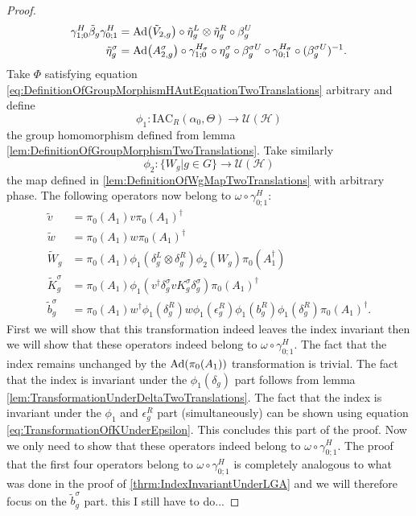 \documentclass[12pt,a4paper,twoside]{article}
\newcommand{\IAC}{\textrm{IAC}}
\let\originalleft\left
\let\originalright\right
\renewcommand{\left}{\mathopen{}\mathclose\bgroup\originalleft}
\renewcommand{\right}{\aftergroup\egroup\originalright}
\newcommand{\UU}{\mathcal U}
\newcommand{\HH}{\mathcal H}
\newcommand{\Ad}[1]{\textrm{Ad}\left(#1\right)}
\theoremstyle{definition}
\numberwithin{equation}{section}
\begin{document}
\begin{proof}
	\begin{align}
		\label{eq:IndexInvariantUnderLGAEtaTildeDefiniton1TwoTrans}
		\gamma^{H}_{1;0}\tilde{\beta}_g\gamma^{H}_{0;1}&=\Ad{\tilde V_{2,g}}\circ\tilde{\eta}_g^L\otimes\tilde{\eta}_g^R\circ\beta_g^U\\
		\label{eq:IndexInvariantUnderLGAEtaTildeDefiniton2TwoTrans}
		\tilde{\eta}_g^\sigma&=\Ad{A_{2,g}^\sigma}\circ\gamma^{H_\sigma}_{1;0}\circ\eta_g^\sigma\circ\beta_g^{\sigma U}\circ\gamma^{H_\sigma}_{0;1}\circ(\beta_g^{\sigma U})^{-1}.
	\end{align}
	Take $\Phi$ satisfying equation \ref{eq:DefinitionOfGroupMorphismHAutEquationTwoTranslations} arbitrary and define
	\begin{equation}
		\phi_1:\IAC_R(\alpha_0,\Theta) \rightarrow \UU(\HH)
	\end{equation}
	the group homomorphism defined from lemma \ref{lem:DefinitionOfGroupMorphismTwoTranslations}. Take similarly
	\begin{equation}
		\phi_2:\{W_g|g\in G\}\rightarrow \UU(\HH)
	\end{equation}
	the map defined in \ref{lem:DefinitionOfWgMapTwoTranslations} with arbitrary phase. The following operators now belong to $\omega\circ\gamma^{H}_{0;1}:$
	\begin{align}
		\tilde{v}&=\pi_0(A_1)v\pi_0(A_1)^\dagger\\
		\tilde{w}&=\pi_0(A_1)w\pi_0(A_1)^\dagger\\
		\tilde{W}_g&=\pi_0(A_1)\phi_1(\delta^L_g\otimes\delta^R_g)\phi_2( W_g)\pi_0(A_1^\dagger)\\
		\tilde{K}_g^\sigma&=\pi_0(A_1)\phi_1(v^\dagger \delta_g^\sigma v K_g^\sigma \delta_g^\sigma) \pi_0(A_1)^\dagger\\
		\tilde{b}_g^\sigma&=\pi_0(A_1)w^\dagger \phi_1(\delta_g^R)w \phi_1(\epsilon_g^R)\phi_1(b_g^R)\phi_1(\delta_g^R)\pi_0(A_1)^\dagger.
	\end{align}
	First we will show that this transformation indeed leaves the index invariant then we will show that these operators indeed belong to $\omega\circ\gamma^H_{0;1}$. The fact that the index remains unchanged by the $\Ad{\pi_0(A_1)}$ transformation is trivial. The fact that the index is invariant under the $\phi_1(\delta_g)$ part follows from lemma \ref{lem:TransformationUnderDeltaTwoTranslations}. The fact that the index is invariant under the $\phi_1$ and $\epsilon^R_g$ part (simultaneously) can be shown using equation \eqref{eq:TransformationOfKUnderEpsilon}. This concludes this part of the proof. Now we only need to show that these operators indeed belong to $\omega\circ\gamma^H_{0;1}$. The proof that the first four operators belong to $\omega\circ\gamma^H_{0;1}$ is completely analogous to what was done in the proof of \ref{thrm:IndexInvariantUnderLGA} and we will therefore focus on the $\tilde{b}_g^\sigma$ part. {\color{red}this I still have to do...}
\end{proof}
\end{document}
